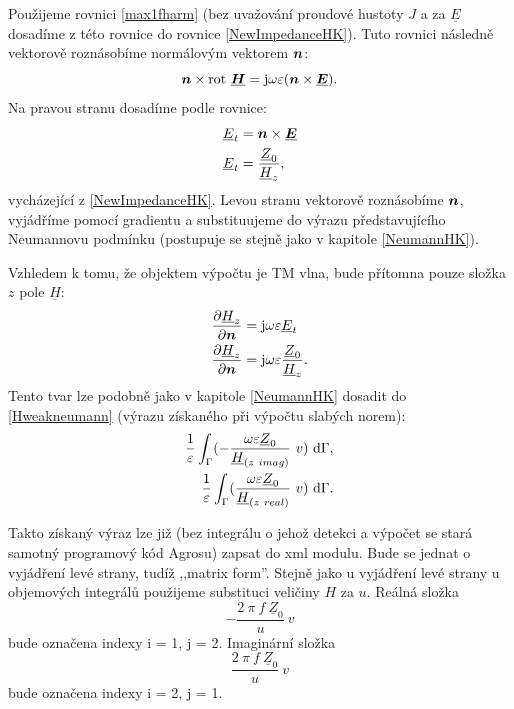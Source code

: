 \documentclass[12pt,a4paper,oneside]{article}
\numberwithin{equation}{section} %
\numberwithin{figure}{section} %
\numberwithin{table}{section} %
\newcommand{\mj}{\mathrm{j}} %
\renewcommand{\vec}[1]{\mbox{\boldmath$#1$}} %
\newcommand{\faz}[1]{{\underline{#1}}} %
\newcommand{\rot}{\mathrm{rot}\ }
\begin{document}
Použijeme rovnici \ref{max1fharm} (bez uvažování proudové hustoty $J$ a za $\faz{E}$ dosadíme z této rovnice do rovnice \ref{NewImpedanceHK}). Tuto rovnici následně vektorově roznásobíme normálovým vektorem $\vec{n}$:
\begin{equation}
\vec{n} \times \rot \faz{\vec{H}} = \mj \omega \varepsilon (\vec{n} \times \faz{\vec{E}}) .
\end{equation}
Na pravou stranu dosadíme podle rovnice:
\begin{subequations}
\begin{align}
\faz{E} _t &= \vec{n} \times \faz{\vec{E}}
\\
\faz{E} _t &= \frac{\faz{Z} _0}{\faz{H} _z} ,
\end{align}
\end{subequations}
vycházející z \ref{NewImpedanceHK}. Levou stranu vektorově roznásobíme $\vec{n}$, vyjádříme pomocí gradientu a substituujeme do výrazu představujícího Neumannovu podmínku (postupuje se stejně jako v kapitole \ref{NeumannHK}).

Vzhledem k tomu, že objektem výpočtu je TM vlna, bude přítomna pouze složka $z$ pole $\faz{H}$:
\begin{subequations}
\begin{align}
\frac{\partial \faz{H} _z}{\partial \vec{n}} &= \mj \omega \varepsilon \faz{E} _t
\\
\frac{\partial \faz{H} _z}{\partial \vec{n}} &= \mj \omega \varepsilon \frac{\faz{Z} _0}{\faz{H} _z} .
\end{align}
\end{subequations}
Tento tvar lze podobně jako v kapitole \ref{NeumannHK} dosadit do \ref{Hweakneumann} (výrazu získaného při výpočtu slabých norem):
\begin{subequations}
\begin{align}
\frac{1}{\varepsilon} \int _{\Gamma} ( - \frac{\omega \varepsilon \faz{Z} _0}{\faz{H} _{(z~imag)}} ~ v ) ~ \ud \Gamma ,
\\ 
\frac{1}{\varepsilon} \int _{\Gamma} ( \frac{\omega \varepsilon \faz{Z} _0}{\faz{H} _{(z~real)}} ~ v ) ~ \ud \Gamma .
\end{align}
\end{subequations}

Takto získaný výraz lze již (bez integrálu o jehož detekci a výpočet se stará samotný programový kód Agrosu) zapsat do xml modulu. Bude se jednat o vyjádření levé strany, tudíž ,,matrix form''. Stejně jako u vyjádření levé strany u objemových integrálů použijeme substituci veličiny $H$ za $u$. Reálná složka 
\begin{equation}
- \frac{2 ~ \pi ~ f ~ \faz{Z} _0}{u} ~ v
\end{equation} 
bude označena indexy i = 1, j = 2. Imaginární složka 
\begin{equation}
\frac{2 ~ \pi ~ f ~ \faz{Z} _0}{u} ~ v
\end{equation}
bude označena indexy i = 2, j = 1.
\end{document}
